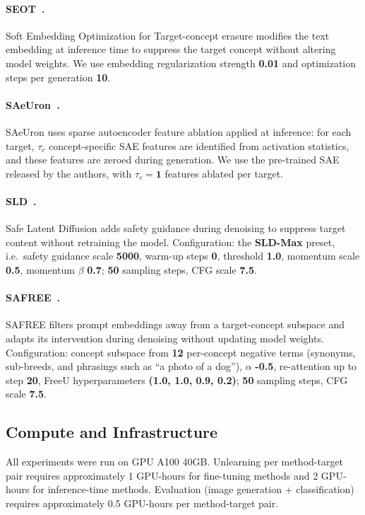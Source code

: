 \paragraph{SEOT~\citep{li2024get}.} 
Soft Embedding Optimization for Target-concept erasure modifies the text embedding at inference time to suppress the target concept without altering model weights. We use embedding regularization strength \textbf{0.01} and optimization steps per generation \textbf{10}.
\paragraph{SAeUron~\citep{cywinski2025saeuron}.} 
SAeUron uses sparse autoencoder feature ablation applied at inference: for each target, $\tau_c$ concept-specific SAE features are identified from activation statistics, and these features are zeroed during generation. We use the pre-trained SAE released by the authors, with 
$\tau_c = \textbf{1}$ features ablated per target. 


\paragraph{SLD~\citep{schramowski2023safe}.}
Safe Latent Diffusion adds safety guidance during denoising to suppress target content without retraining the model.
Configuration: the \textbf{SLD-Max} preset, i.e.\ safety guidance scale \textbf{5000}, warm-up steps \textbf{0}, threshold \textbf{1.0}, momentum scale \textbf{0.5}, momentum $\beta$ \textbf{0.7}; \textbf{50} sampling steps, CFG scale \textbf{7.5}.

\paragraph{SAFREE~\citep{yoon2025safree}.}
SAFREE filters prompt embeddings away from a target-concept subspace and adapts its intervention during denoising without updating model weights.
Configuration: concept subspace from \textbf{12} per-concept negative terms (synonyms, sub-breeds, and phrasings such as ``a photo of a dog''), $\alpha$ \textbf{-0.5}, re-attention up to step \textbf{20}, FreeU hyperparameters \textbf{(1.0, 1.0, 0.9, 0.2)}; \textbf{50} sampling steps, CFG scale \textbf{7.5}.


\subsection{Compute and Infrastructure}
\label{app:compute}
All experiments were run on GPU A100 40GB. Unlearning per method-target pair requires approximately 1 GPU-hours for fine-tuning methods and 2 GPU-hours for inference-time methods. Evaluation (image generation + classification) requires approximately 0.5 GPU-hours per method-target pair.

